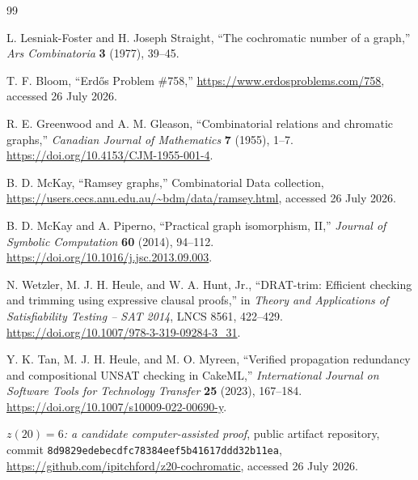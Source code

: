 \documentclass[11pt,a4paper]{article}
\theoremstyle{definition}
\theoremstyle{remark}
\newcommand{\sha}[1]{\texttt{\footnotesize #1}}
\begin{document}
\small\raggedright
\begin{thebibliography}{99}

L. Lesniak-Foster and H. Joseph Straight,
``The cochromatic number of a graph,''
\emph{Ars Combinatoria} \textbf{3} (1977), 39--45.

T. F. Bloom,
``Erd\H{o}s Problem \#758,''
\url{https://www.erdosproblems.com/758},
accessed 26 July 2026.

R. E. Greenwood and A. M. Gleason,
``Combinatorial relations and chromatic graphs,''
\emph{Canadian Journal of Mathematics} \textbf{7} (1955), 1--7.
\url{https://doi.org/10.4153/CJM-1955-001-4}.

B. D. McKay,
``Ramsey graphs,'' Combinatorial Data collection,
\url{https://users.cecs.anu.edu.au/~bdm/data/ramsey.html},
accessed 26 July 2026.

B. D. McKay and A. Piperno,
``Practical graph isomorphism, II,''
\emph{Journal of Symbolic Computation} \textbf{60} (2014), 94--112.
\url{https://doi.org/10.1016/j.jsc.2013.09.003}.

N. Wetzler, M. J. H. Heule, and W. A. Hunt, Jr.,
``DRAT-trim: Efficient checking and trimming using expressive clausal
proofs,'' in \emph{Theory and Applications of Satisfiability Testing --
SAT 2014}, LNCS 8561, 422--429.
\url{https://doi.org/10.1007/978-3-319-09284-3_31}.

Y. K. Tan, M. J. H. Heule, and M. O. Myreen,
``Verified propagation redundancy and compositional UNSAT checking in
CakeML,''
\emph{International Journal on Software Tools for Technology Transfer}
\textbf{25} (2023), 167--184.
\url{https://doi.org/10.1007/s10009-022-00690-y}.

\emph{\(z(20)=6\): a candidate computer-assisted proof},
public artifact repository, commit
\sha{8d9829edebecdfc78384eef5b41617ddd32b11ea},
\url{https://github.com/ipitchford/z20-cochromatic},
accessed 26 July 2026.

\end{thebibliography}
\normalsize
\end{document}

